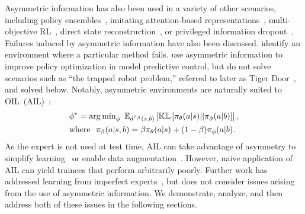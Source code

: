 Asymmetric information has also been used in a variety of other scenarios, including policy ensembles~\citep{sasaki2021behavioral, Song2019}, imitating attention-based representations~\citep{salter2019attentionprivileged}, multi-objective RL~\citep{Schwab2019}, direct state reconstruction~\citep{nguyen2020belief}, or privileged information dropout~\citep{pierrealex2020privileged, lambert2018deep}.  Failures induced by asymmetric information have also been discussed.  \citet{arora2018hindsight} identify an environment where a particular method fails.  \citet{choudhury2018data} use asymmetric information to improve policy optimization in model predictive control, but do not solve scenarios such as ``the trapped robot problem,'' referred to later as Tiger Door~\citep{littman1995pomdp}, and solved below. Notably, asymmetric environments are naturally suited to OIL~(AIL)~\citep{pinto2017asymmetric}:
\begin{align}
     &\phi^* = \argmin_{\phi}\ \mathbb{E}_{d^{\pi_{\beta}}(s,b)}  \left[ \mathbb{KL} \left[ \pi_{\theta}(a|s) || \pi_{\phi}(a|b) \right] \right], \\ 
     &\mathrm{where}\ \ \pi_{\beta}(a | s, b) = \beta \pi_{\theta}(a | s) + (1-\beta) \pi_{\phi}(a | b). \label{equ:background:asym_dagger_mixture} %
\end{align}
As the expert is not used at test time, AIL can take advantage of asymmetry to simplify learning~\citep{pinto2017asymmetric} or enable data augmentation~\citep{Chen2019}. However, naive application of AIL can yield trainees that perform arbitrarily poorly. Further work has addressed learning from imperfect experts~\citep{ross2014reinforcement, pmlr-v70-sun17d, meng2019conditional}, but does not consider issues arising from the use of asymmetric information.  We demonstrate, analyze, and then address both of these issues in the following sections. 
